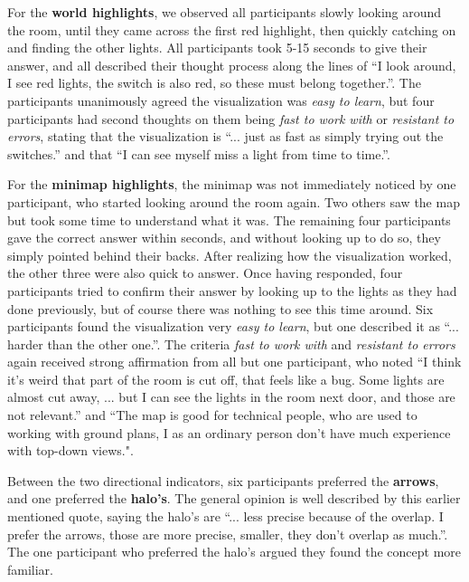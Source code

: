 For the \textbf{world highlights}, we observed all participants slowly looking around the room, until they came across the first red highlight, then quickly catching on and finding the other lights. All participants took 5-15 seconds to give their answer, and all described their thought process along the lines of ``I look around, I see red lights, the switch is also red, so these must belong together.''. The participants unanimously agreed the visualization was \textit{easy to learn}, but four participants had second thoughts on them being \textit{fast to work with} or \textit{resistant to errors}, stating that the visualization is ``... just as fast as simply trying out the switches.'' and that ``I can see myself miss a light from time to time.''.

For the \textbf{minimap highlights}, the minimap was not immediately noticed by one participant, who started looking around the room again. Two others saw the map but took some time to understand what it was. The remaining four participants gave the correct answer within seconds, and without looking up to do so, they simply pointed behind their backs. After realizing how the visualization worked, the other three were also quick to answer. Once having responded, four participants tried to confirm their answer by looking up to the lights as they had done previously, but of course there was nothing to see this time around. Six participants found the visualization very \textit{easy to learn}, but one described it as ``... harder than the other one.''. The criteria \textit{fast to work with} and \textit{resistant to errors} again received strong affirmation from all but one participant, who noted ``I think it's weird that part of the room is cut off, that feels like a bug. Some lights are almost cut away, ... but I can see the lights in the room next door, and those are not relevant.'' and ``The map is good for technical people, who are used to working with ground plans, I as an ordinary person don't have much experience with top-down views.".

Between the two directional indicators, six participants preferred the \textbf{arrows}, and one preferred the \textbf{halo's}. The general opinion is well described by this earlier mentioned quote, saying the halo's are ``... less precise because of the overlap. I prefer the arrows, those are more precise, smaller, they don't overlap as much.''. The one participant who preferred the halo's argued they found the concept more familiar. 



